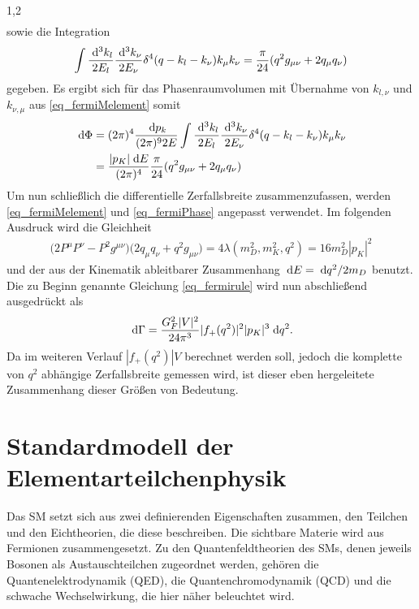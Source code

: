 \documentclass[11pt,a4paper,twoside]{report}
\begin{document}
\begin{spacing}{1,2}
\begin{align}
\end{align}
sowie die Integration
\begin{align}
 \int \frac{\; \mathrm{d}^3k_l}{2E_l}\frac{\; \mathrm{d}^3k_\nu}{2E_\nu}\delta^4(q-k_l-k_\nu)k_\mu k_\nu = \frac{\pi}{24}(q^2 g_{\mu\nu} + 2 q_\mu q_\nu)
\end{align}
gegeben. Es ergibt sich für das Phasenraumvolumen mit Übernahme von $k_{l,\nu}$ und $k_{\nu,\mu}$ aus \eqref{eq_fermiMelement} somit
\begin{align}
 \; \mathrm{d} \Phi &= (2\pi)^4 \frac{\; \mathrm{d} p_k}{(2\pi)^9 2E} \int \frac{\; \mathrm{d}^3k_l}{2E_l}\frac{\; \mathrm{d}^3k_\nu}{2E_\nu}\delta^4(q-k_l-k_\nu)k_\mu k_\nu \nonumber\\
 &= \frac{|p_K| \; \mathrm{d} E}{(2\pi)^4}\frac{\pi}{24}(q^2g_{\mu\nu} + 2 q_\mu q_\nu)
 \label{eq_fermiPhase}
\end{align}
Um nun schließlich die differentielle Zerfallsbreite zusammenzufassen, werden \eqref{eq_fermiMelement} und \eqref{eq_fermiPhase} angepasst verwendet. Im
folgenden Ausdruck wird die Gleichheit
\begin{align}
 \big(2P^\mu P^\nu - P^2 g^{\mu\nu}\big)\big(2q_\mu q_\nu + q^2g_{\mu\nu}) = 4 \lambda(m_D^2,m_K^2,q^2) = 16 m_D^2 |p_K|^2
\end{align}
und der aus der Kinematik ableitbarer Zusammenhang $\; \mathrm{d} E = \; \mathrm{d} q^2 / 2m_D$ benutzt. Die zu Beginn genannte Gleichung \eqref{eq_fermirule} wird 
nun abschließend ausgedrückt als
\begin{align}
 \; \mathrm{d} \Gamma = \frac{G_F^2|V|^2}{24\pi^3} |f_+(q^2)|^2 |p_K|^3 \; \mathrm{d} q^2.
 \label{eq_fermidGammafinal}
\end{align}
Da im weiteren Verlauf $|f_+(q^2)|V$ berechnet werden soll, jedoch die komplette von $q^2$ abhängige Zerfallsbreite gemessen wird, ist dieser eben hergeleitete
Zusammenhang dieser Größen von Bedeutung.



\section{Standardmodell der Elementarteilchenphysik}
Das SM setzt sich aus zwei definierenden Eigenschaften zusammen, den Teilchen und den Eichtheorien, die diese beschreiben. Die sichtbare Materie wird 
aus Fermionen zusammengesetzt. Zu den Quantenfeldtheorien des SMs, denen jeweils Bosonen als Austauschteilchen zugeordnet werden, gehören die 
Quantenelektrodynamik (QED), die Quantenchromodynamik (QCD) und die schwache Wechselwirkung, die hier näher beleuchtet wird. 


\end{spacing}
\end{document}
